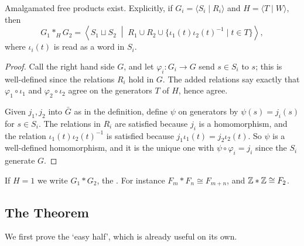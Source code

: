 \documentclass[a4paper]{scrartcl}
\newcommand{\genby}[1]{\langle #1 \rangle}
\begin{document}
\begin{proposition} \label{prop:afp-exists}
	Amalgamated free products exist. Explicitly, if $G_i = \genby{S_i \mid R_i}$ and $H = \genby{T \mid W}$, then
	$$
	G_1 *_H G_2 = \left\langle S_1 \sqcup S_2 \;\middle|\; R_1 \cup R_2 \cup \{\iota_1(t)\iota_2(t)^{-1} \mid t \in T\}\right\rangle,
	$$
	where $\iota_i(t)$ is read as a word in $S_i$.
\end{proposition}
\begin{proof}
	Call the right hand side $G$, and let $\varphi_i: G_i \to G$ send $s \in S_i$ to $s$; this is well-defined since the relations $R_i$ hold in $G$. The added relations say exactly that $\varphi_1 \circ\iota_1$ and $\varphi_2\circ\iota_2$ agree on the generators $T$ of $H$, hence agree.

	Given $j_1, j_2$ into $\bar G$ as in the definition, define $\psi$ on generators by $\psi(s) = j_i(s)$ for $s \in S_i$. The relations in $R_i$ are satisfied because $j_i$ is a homomorphism, and the relation $\iota_1(t)\iota_2(t)^{-1}$ is satisfied because $j_1\iota_1(t) = j_2\iota_2(t)$. So $\psi$ is a well-defined homomorphism, and it is the unique one with $\psi\circ\varphi_i = j_i$ since the $S_i$ generate $G$.
\end{proof}

\begin{example}
	If $H = 1$ we write $G_1 * G_2$, the . For instance $F_m * F_n \cong F_{m+n}$, and $\mathbb{Z} * \mathbb{Z} \cong F_2$.
\end{example}

\subsection{The Theorem}

We first prove the `easy half', which is already useful on its own.
\end{document}
